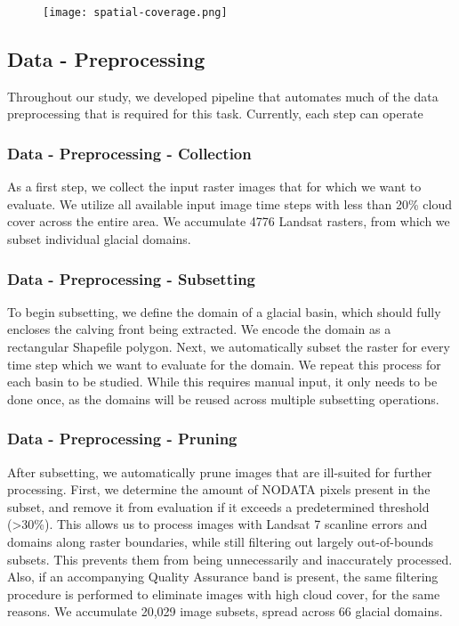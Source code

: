 \documentclass[tc, manuscript]{copernicus}
\begin{document}
\begin{figure} %
    \centering
    \texttt{[image: spatial-coverage.png]}
\end{figure}



\subsection{Data - Preprocessing}
Throughout our study, we developed pipeline that automates much of the data preprocessing that is required for this task. Currently, each step can operate 

\subsubsection{Data - Preprocessing - Collection}
As a first step, we collect the input raster images that for which we want to evaluate. We utilize all available input image time steps with less than 20\% cloud cover across the entire area. We accumulate 4776 Landsat rasters, from which we subset individual glacial domains. 

\subsubsection{Data - Preprocessing - Subsetting}
To begin subsetting, we define the domain of a glacial basin, which should fully encloses the calving front being extracted. We encode the domain as a rectangular Shapefile polygon. Next, we automatically subset the raster for every time step which we want to evaluate for the domain. We repeat this process for each basin to be studied. While this requires manual input, it only needs to be done once, as the domains will be reused across multiple subsetting operations.

\subsubsection{Data - Preprocessing - Pruning}
After subsetting, we automatically prune images that are ill-suited for further processing. First, we determine the amount of NODATA pixels present in the subset, and remove it from evaluation if it exceeds a predetermined threshold (>30\%). This allows us to process images with Landsat 7 scanline errors and domains along raster boundaries, while still filtering out largely out-of-bounds subsets. This prevents them from being unnecessarily and inaccurately processed. Also, if an accompanying Quality Assurance band is present, the same filtering procedure is performed to eliminate images with high cloud cover, for the same reasons. We accumulate 20,029 image subsets, spread across 66 glacial domains.
\end{document}

